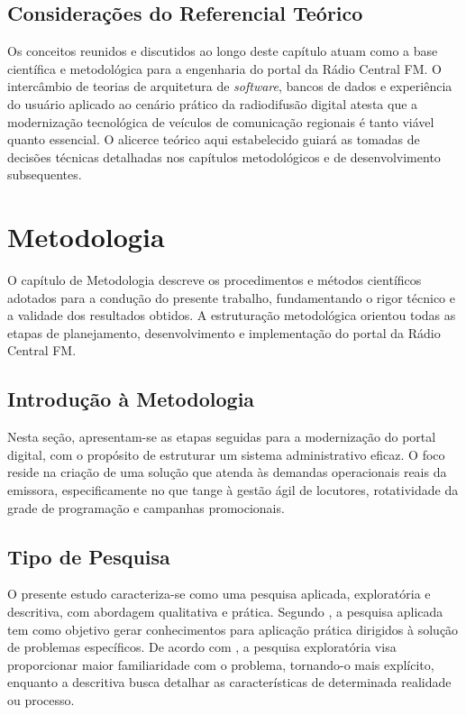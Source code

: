 \documentclass[12pt, openright, oneside, a4paper, brazil]{ads-unipac-abntex2}
\begin{document}
\section{Considerações do Referencial Teórico}

Os conceitos reunidos e discutidos ao longo deste capítulo atuam como a base científica e metodológica para a engenharia do portal da Rádio Central FM. O intercâmbio de teorias de arquitetura de \textit{software}, bancos de dados e experiência do usuário aplicado ao cenário prático da radiodifusão digital atesta que a modernização tecnológica de veículos de comunicação regionais é tanto viável quanto essencial. O alicerce teórico aqui estabelecido guiará as tomadas de decisões técnicas detalhadas nos capítulos metodológicos e de desenvolvimento subsequentes.

\chapter[Metodologia]{Metodologia}
O capítulo de Metodologia descreve os procedimentos e métodos científicos adotados para a condução do presente trabalho, fundamentando o rigor técnico e a validade dos resultados obtidos. A estruturação metodológica orientou todas as etapas de planejamento, desenvolvimento e implementação do portal da Rádio Central FM.

\section{Introdução à Metodologia}
Nesta seção, apresentam-se as etapas seguidas para a modernização do portal digital, com o propósito de estruturar um sistema administrativo eficaz. O foco reside na criação de uma solução que atenda às demandas operacionais reais da emissora, especificamente no que tange à gestão ágil de locutores, rotatividade da grade de programação e campanhas promocionais.

\section{Tipo de Pesquisa}
O presente estudo caracteriza-se como uma pesquisa aplicada, exploratória e descritiva, com abordagem qualitativa e prática. Segundo , a pesquisa aplicada tem como objetivo gerar conhecimentos para aplicação prática dirigidos à solução de problemas específicos. De acordo com , a pesquisa exploratória visa proporcionar maior familiaridade com o problema, tornando-o mais explícito, enquanto a descritiva busca detalhar as características de determinada realidade ou processo.
\end{document}
